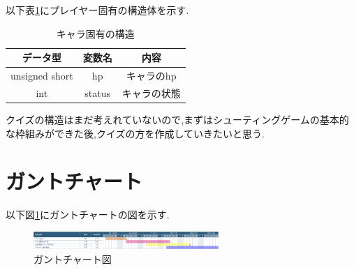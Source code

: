 \documentclass{jarticle}
\begin{document}
以下表\ref{table:player}にプレイヤー固有の構造体を示す.
\begin{table}[H]
\caption{キャラ固有の構造}
	\begin{center}
		\begin{tabular}{|c|c|c|}\hline 
		データ型& 変数名 & 内容 \\ \hline
		unsigned short & hp & キャラのhp \\ 
		int &status &キャラの状態  \\
		\hline
		\end{tabular}
	\end{center}
\label{table:player} 
\end{table}

クイズの構造はまだ考えれていないので,まずはシューティングゲームの基本的な枠組みができた後,クイズの方を作成していきたいと思う.

\section{ガントチャート}
以下図\ref{fig:gantt}にガントチャートの図を示す.

\begin{figure}[H]
\begin{center}
\includegraphics[width=7.0cm]{chart.png}
\caption{ガントチャート図}
\label{fig:gantt}
\end{center}
\end{figure}
\end{document}

